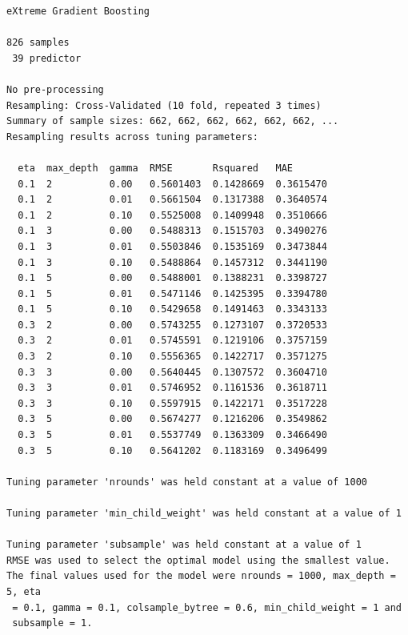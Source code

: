 \documentclass[
  letterpaper,
  DIV=11,
  numbers=noendperiod]{scrreprt}
\newenvironment{Shaded}{\begin{snugshade}}{\end{snugshade}}
\newcommand{\NormalTok}[1]{\textcolor[rgb]{0.00,0.23,0.31}{#1}}
\newcommand{\SpecialCharTok}[1]{\textcolor[rgb]{0.37,0.37,0.37}{#1}}
\begin{document}
\begin{verbatim}
eXtreme Gradient Boosting 

826 samples
 39 predictor

No pre-processing
Resampling: Cross-Validated (10 fold, repeated 3 times) 
Summary of sample sizes: 662, 662, 662, 662, 662, 662, ... 
Resampling results across tuning parameters:

  eta  max_depth  gamma  RMSE       Rsquared   MAE      
  0.1  2          0.00   0.5601403  0.1428669  0.3615470
  0.1  2          0.01   0.5661504  0.1317388  0.3640574
  0.1  2          0.10   0.5525008  0.1409948  0.3510666
  0.1  3          0.00   0.5488313  0.1515703  0.3490276
  0.1  3          0.01   0.5503846  0.1535169  0.3473844
  0.1  3          0.10   0.5488864  0.1457312  0.3441190
  0.1  5          0.00   0.5488001  0.1388231  0.3398727
  0.1  5          0.01   0.5471146  0.1425395  0.3394780
  0.1  5          0.10   0.5429658  0.1491463  0.3343133
  0.3  2          0.00   0.5743255  0.1273107  0.3720533
  0.3  2          0.01   0.5745591  0.1219106  0.3757159
  0.3  2          0.10   0.5556365  0.1422717  0.3571275
  0.3  3          0.00   0.5640445  0.1307572  0.3604710
  0.3  3          0.01   0.5746952  0.1161536  0.3618711
  0.3  3          0.10   0.5597915  0.1422171  0.3517228
  0.3  5          0.00   0.5674277  0.1216206  0.3549862
  0.3  5          0.01   0.5537749  0.1363309  0.3466490
  0.3  5          0.10   0.5641202  0.1183169  0.3496499

Tuning parameter 'nrounds' was held constant at a value of 1000

Tuning parameter 'min_child_weight' was held constant at a value of 1

Tuning parameter 'subsample' was held constant at a value of 1
RMSE was used to select the optimal model using the smallest value.
The final values used for the model were nrounds = 1000, max_depth = 5, eta
 = 0.1, gamma = 0.1, colsample_bytree = 0.6, min_child_weight = 1 and
 subsample = 1.
\end{verbatim}

\begin{Shaded}
\end{Shaded}
\end{document}
